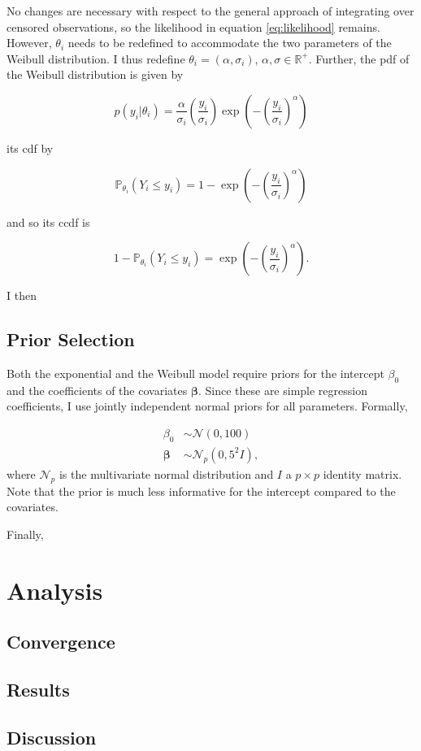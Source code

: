 \documentclass[11pt]{article}
\begin{document}
No changes are necessary with respect to the general approach of integrating over censored observations, so the likelihood in equation \ref{eq:likelihood} remains. However, $\theta_i$ needs to be redefined to accommodate the two parameters of the Weibull distribution. I thus redefine $\theta_i = (\alpha, \sigma_i)$, $\alpha, \sigma \in \mathbb{R}^+$. Further, the pdf of the Weibull distribution is given by 

\begin{equation*}
    p(y_i|\theta_i) = \frac{\alpha}{\sigma_i} \left(\frac{y_i}{\sigma_i}\right) \exp\left(-\left(\frac{y_i}{\sigma_i}\right)^{\alpha}\right)
\end{equation*}

its cdf by

\begin{equation*}
    \mathbb{P}_{\theta_i}(Y_i \leq y_i) = 1 - \exp\left(-\left(\frac{y_i}{\sigma_i}\right)^{\alpha}\right)
\end{equation*}

and so its ccdf is

\begin{equation*}
    1 - \mathbb{P}_{\theta_i}(Y_i \leq y_i) = \exp\left(-\left(\frac{y_i}{\sigma_i}\right)^{\alpha}\right).
\end{equation*}

I then 

\subsection{Prior Selection}
Both the exponential and the Weibull model require priors for the intercept $\beta_0$ and the coefficients of the covariates $\bm\beta$. Since these are simple regression coefficients, I use jointly independent normal priors for all parameters. Formally, 

\begin{align*}
    \beta_0 &\sim \mathcal{N}(0, 100) \\
    \bm{\beta} &\sim \mathcal{N}_{p}(0, 5^2I),
\end{align*}
where $\mathcal{N}_p$ is the multivariate normal distribution and $I$ a $p\times p$ identity matrix. Note that the prior is much less informative for the intercept compared to the covariates. 

Finally, 

\section{Analysis}
\subsection{Convergence}
\subsection{Results}
\subsection{Discussion}

\newpage

\printbibliography

\newpage


\end{document}
